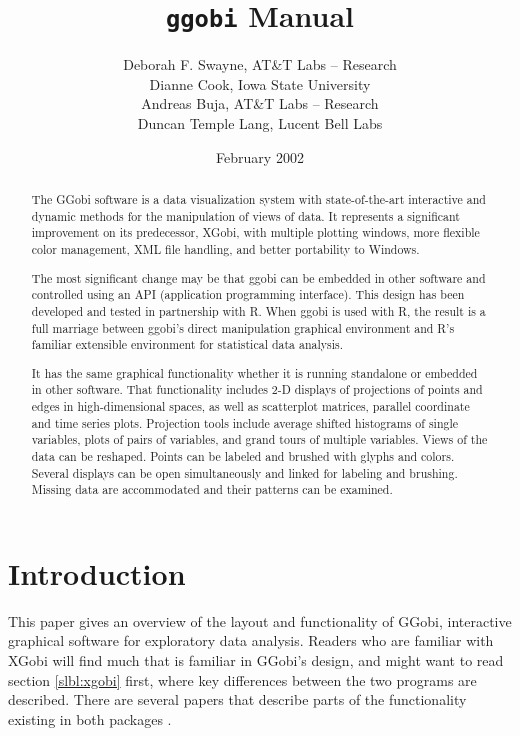 \documentclass[11pt]{article}
\begin{document}
\title {{\tt ggobi} Manual}
\author{
Deborah F. Swayne, AT\&T Labs -- Research \\
Dianne Cook, Iowa State University \\
Andreas Buja, AT\&T Labs -- Research \\
Duncan Temple Lang, Lucent Bell Labs
}

\date{February 2002}

\maketitle

\begin{abstract}

The GGobi software is a data visualization system with state-of-the-art
interactive and dynamic methods for the manipulation of views of
data.  It represents a significant improvement on its predecessor, XGobi,
with multiple plotting windows, more flexible color management, XML file
handling, and better portability to Windows.

The most significant change may be that ggobi can be embedded in other
software and controlled using an API (application programming
interface).  This design has been developed and tested in partnership
with R.  When ggobi is used with R, the result is a full marriage
between ggobi's direct manipulation graphical environment and R's
familiar extensible environment for statistical data analysis.

It has the same graphical functionality whether it is running
standalone or embedded in other software.  That functionality
includes 2-D displays of projections of points and edges in
high-dimensional spaces, as well as scatterplot matrices, parallel
coordinate and time series plots.  Projection tools include average
shifted histograms of single variables, plots of pairs of variables,
and grand tours of multiple variables.  Views of the data can be
reshaped.  Points can be labeled and brushed with glyphs and colors.
Several displays can be open simultaneously and linked for labeling
and brushing.  Missing data are accommodated and their patterns can
be examined.
\end{abstract}

\section{Introduction}

This paper gives an overview of the layout and functionality of GGobi,
interactive graphical software for exploratory data analysis.  Readers
who are familiar with XGobi will find much that is familiar in GGobi's
design, and might want to read section \ref{slbl:xgobi} first, where
key differences between the two programs are described. There are
several papers that describe parts of the functionality existing in
both packages
\cite{BCS95,SCB97,SB98,BAHM88,CBC93,CBCH95,CB95,BCAH95c}.
\end{document}
